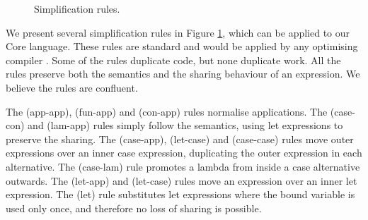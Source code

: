 \begin{figure}
\begin{simplify}

\end{simplify}
\caption{Simplification rules.}
\label{figB:simplify}
\end{figure}

We present several simplification rules in Figure \ref{figB:simplify}, which can be applied to our Core language. These rules are standard and would be applied by any optimising compiler \cite{spj:transformation}. Some of the rules duplicate code, but none duplicate work. All the rules preserve both the semantics and the sharing behaviour of an expression. We believe the rules are confluent.

The (app-app), (fun-app) and (con-app) rules normalise applications. The (case-con) and (lam-app) rules simply follow the semantics, using let expressions to preserve the sharing. The (case-app), (let-case) and (case-case) rules move outer expressions over an inner case expression, duplicating the outer expression in each alternative. The (case-lam) rule promotes a lambda from inside a case alternative outwards. The (let-app) and (let-case) rules move an expression over an inner let expression. The (let) rule substitutes let expressions where the bound variable is used only once, and therefore no loss of sharing is possible.


